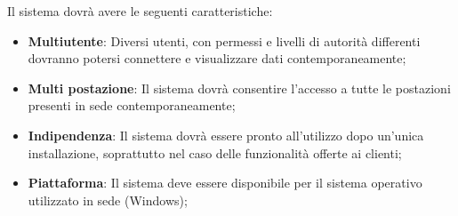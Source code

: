 \documentclass[a4paper,12pt]{article}
\begin{document}
  Il sistema dovrà avere le seguenti caratteristiche:
  \begin{itemize}
    \item{\textbf{Multiutente}}: Diversi utenti, con permessi e livelli di autorità differenti dovranno potersi connettere e visualizzare dati
      contemporaneamente;
    \item{\textbf{Multi postazione}}: Il sistema dovrà consentire l'accesso a tutte le postazioni presenti in sede contemporaneamente;
    \item{\textbf{Indipendenza}}: Il sistema dovrà essere pronto all'utilizzo dopo un'unica installazione, soprattutto nel caso delle funzionalità offerte ai clienti;
    \item{\textbf{Piattaforma}}: Il sistema deve essere disponibile per il sistema operativo utilizzato in sede (Windows);


  \end{itemize}
  
\end{document}
